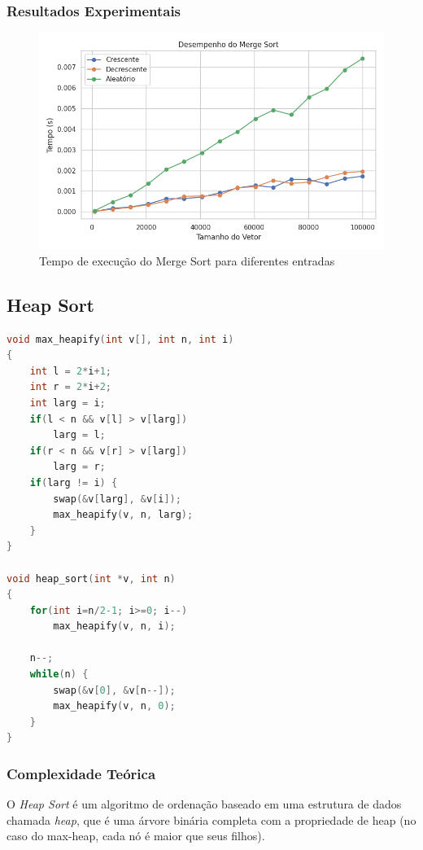 \subsubsection{Resultados Experimentais}
\begin{figure}[H]
    \centering
    \includegraphics[width=1\textwidth]{../codigos/resultados/merge_grafico.png}
    \caption{Tempo de execução do Merge Sort para diferentes entradas}
    \label{fig:merge-grafico}
\end{figure}

\subsection{Heap Sort}
\begin{lstlisting}[language=C, caption={Implementação do Heap Sort}, label={lst:heap}]
void max_heapify(int v[], int n, int i)
{
    int l = 2*i+1;
    int r = 2*i+2;
    int larg = i;
    if(l < n && v[l] > v[larg])
        larg = l;
    if(r < n && v[r] > v[larg])
        larg = r;
    if(larg != i) {
        swap(&v[larg], &v[i]);
        max_heapify(v, n, larg);
    }
}

void heap_sort(int *v, int n)
{
    for(int i=n/2-1; i>=0; i--)
        max_heapify(v, n, i);

    n--;
    while(n) {
        swap(&v[0], &v[n--]);
        max_heapify(v, n, 0);
    }
}
\end{lstlisting}

\subsubsection{Complexidade Teórica}

O \textit{Heap Sort} é um algoritmo de ordenação baseado em uma estrutura de dados chamada \textit{heap}, que é uma árvore binária completa com a propriedade de heap (no caso do max-heap, cada nó é maior que seus filhos).

